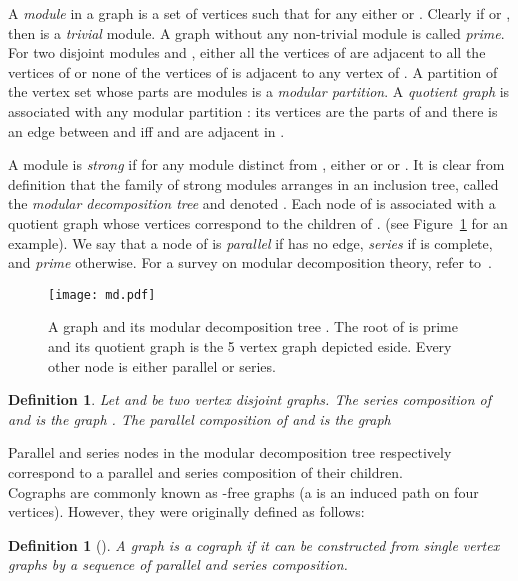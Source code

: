 \documentclass[11pt]{article}
\newtheorem{definition}[lemma]{Definition}
\begin{document}
A \emph{module} in a graph  is a set of vertices  such that for any  either  or . Clearly if  or , then  is a \emph{trivial} module. A graph without any non-trivial module is called \emph{prime}. 
For two disjoint modules  and , either all the vertices of  are adjacent to all the vertices of  or none of the vertices of  is adjacent to any vertex of . A partition  of the vertex set  whose parts are modules is a \emph{modular partition}. A \emph{quotient graph}  is associated with any modular partition : its vertices are the parts of  and there is an edge between  and  iff  and  are adjacent in .

A module  is \emph{strong} if for any module  distinct from , either  or  or . It is clear from definition that the family of strong modules arranges in an inclusion tree, called the \emph{modular decomposition tree} and denoted . Each node  of  is associated with a quotient graph  whose vertices correspond to the children  of . (see Figure~\ref{fig:md-tree} for an example). 
We say that a node  of  is \emph{parallel} if  has no edge, \emph{series} if  is complete, and \emph{prime} otherwise. 
For a survey on modular decomposition theory, refer to~\cite{HP10}.

\begin{figure}[t]
\centerline{\texttt{[image: md.pdf]}}
\caption{A graph  and its modular decomposition tree . The root of  is prime and its quotient graph is the 5 vertex graph depicted eside. Every other node is either parallel or series.
\label{fig:md-tree}
}
\end{figure}

\begin{definition}
Let   and  be two vertex disjoint graphs. The \emph{series composition} of  and  is the graph . The \emph{parallel composition} of  and  is the graph 
\end{definition}

Parallel and series nodes in the modular decomposition tree respectively correspond to a parallel and series composition of their children.  \\

Cographs are commonly known as -free graphs (a  is an induced path on four vertices). However, they were originally defined as follows:

\begin{definition}[\cite{BLS99}]
\label{def:cographs}
	A graph is a cograph if it can be constructed from single vertex graphs by a sequence of parallel and series composition.
\end{definition}
\end{document}
